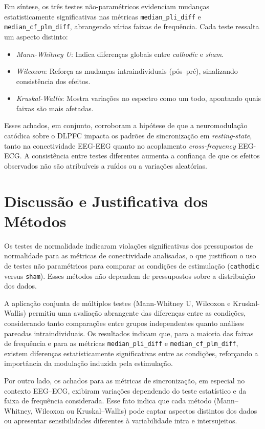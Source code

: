 Em síntese, os três testes não-paramétricos evidenciam mudanças estatisticamente significativas nas métricas \texttt{median\_pli\_diff} e \texttt{median\_cf\_plm\_diff}, abrangendo várias faixas de frequência. Cada teste ressalta um aspecto distinto:
\begin{itemize}
    \item \emph{Mann-Whitney U}: Indica diferenças globais entre \emph{cathodic} e \emph{sham}.
    \item \emph{Wilcoxon}: Reforça as mudanças intraindividuais (pós--pré), sinalizando consistência dos efeitos.
    \item \emph{Kruskal-Wallis}: Mostra variações no espectro como um todo, apontando quais faixas são mais afetadas.
\end{itemize}

Esses achados, em conjunto, corroboram a hipótese de que a neuromodulação catódica sobre o DLPFC impacta os padrões de sincronização em \emph{resting-state}, tanto na conectividade EEG-EEG quanto no acoplamento \emph{cross-frequency} EEG-ECG. A consistência entre testes diferentes aumenta a confiança de que os efeitos observados não são atribuíveis a ruídos ou a variações aleatórias.

\section{Discussão e Justificativa dos Métodos}

Os testes de normalidade indicaram violações significativas dos pressupostos de normalidade para as métricas de conectividade analisadas, o que justificou o uso de testes não paramétricos para comparar as condições de estimulação (\texttt{cathodic} versus \texttt{sham}). Esses métodos não dependem de pressupostos sobre a distribuição dos dados.

A aplicação conjunta de múltiplos testes (Mann-Whitney U, Wilcoxon e Kruskal-Wallis) permitiu uma avaliação abrangente das diferenças entre as condições, considerando tanto comparações entre grupos independentes quanto análises pareadas intraindividuais. Os resultados indicam que, para a maioria das faixas de frequência e para as métricas \texttt{median\_pli\_diff} e \texttt{median\_cf\_plm\_diff}, existem diferenças estatisticamente significativas entre as condições, reforçando a importância da modulação induzida pela estimulação.

Por outro lado, os achados para as métricas de sincronização, em especial no contexto EEG–ECG, exibiram variações dependendo do teste estatístico e da faixa de frequência considerada. Esse fato indica que cada método (Mann–Whitney, Wilcoxon ou Kruskal–Wallis) pode captar aspectos distintos dos dados ou apresentar sensibilidades diferentes à variabilidade intra e intersujeitos.

